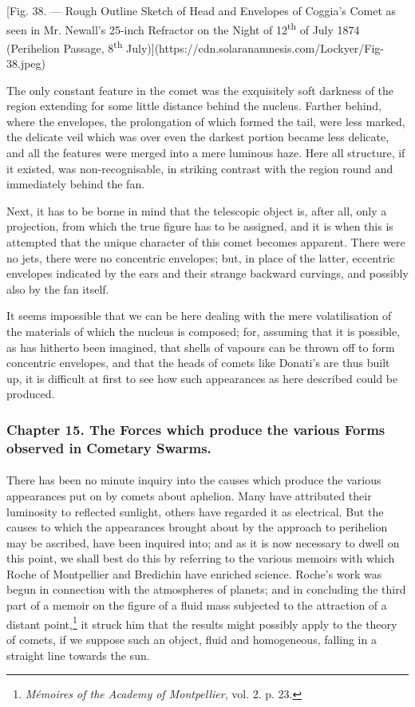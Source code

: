 \documentclass[a4paper, 12pt, oneside, polutonikogreek, english]{article}
\begin{document}
[Fig. 38. --- Rough Outline Sketch of Head and Envelopes of Coggia's Comet as seen in Mr. Newall's 25-inch Refractor on the Night of 12\textsuperscript{th} of July 1874 (Perihelion Passage, 8\textsuperscript{th} July)](https://cdn.solaranamnesis.com/Lockyer/Fig-38.jpeg)

The only constant feature in the comet was the exquisitely soft darkness of the region extending for some little distance behind the nucleus. Farther behind, where the envelopes, the prolongation of which formed the tail, were less marked, the delicate veil which was over even the darkest portion became less delicate, and all the features were merged into a mere luminous haze. Here all structure, if it existed, was non-recognisable, in striking contrast with the region round and immediately behind the fan.

Next, it has to be borne in mind that the telescopic object is, after all, only a projection, from which the true figure has to be assigned, and it is when this is attempted that the unique character of this comet becomes apparent. There were no jets, there were no concentric envelopes; but, in place of the latter, eccentric envelopes indicated by the ears and their strange backward curvings, and possibly also by the fan itself.

It seems impossible that we can be here dealing with the mere volatilisation of the materials of which the nucleus is composed; for, assuming that it is possible, as has hitherto been imagined, that shells of vapours can be thrown off to form concentric envelopes, and that the heads of comets like Donati's are thus built up, it is difficult at first to see how such appearances as here described could be produced.
\clearpage
\subsubsection{Chapter 15. The Forces which produce the various Forms observed in Cometary Swarms.}
\paragraph{}
There has been no minute inquiry into the causes which produce the various appearances put on by comets about aphelion. Many have attributed their luminosity to reflected sunlight, others have regarded it as electrical. But the causes to which the appearances brought about by the approach to perihelion may be ascribed, have been inquired into; and as it is now necessary to dwell on this point, we shall best do this by referring to the various memoirs with which Roche of Montpellier and Bredichin have enriched science. Roche's work was begun in connection with the atmospheres of planets; and in concluding the third part of a memoir on the figure of a fluid mass subjected to the attraction of a distant point,\footnote{\emph{Mémoires of the Academy of Montpellier}, vol. 2. p. 23.} it struck him that the results might possibly apply to the theory of comets, if we suppose such an object, fluid and homogeneous, falling in a straight line towards the sun.
\end{document}
